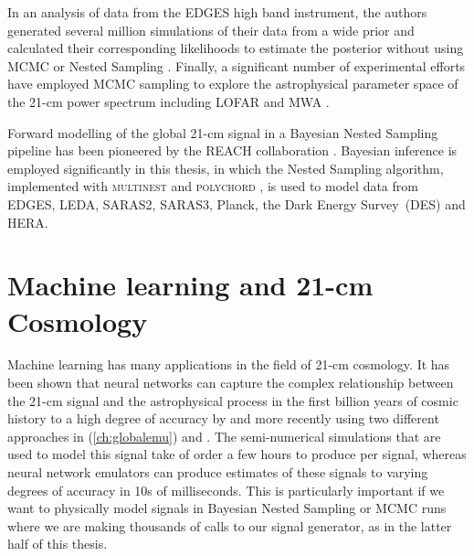 In an analysis of data from the EDGES high band instrument, the authors generated several million simulations of their data from a wide prior and calculated their corresponding likelihoods to estimate the posterior without using MCMC or Nested Sampling \cite{Monsalve_EDGES_HB_3_2019}. Finally, a significant number of experimental efforts have employed MCMC sampling to explore the astrophysical parameter space of the 21-cm power spectrum including LOFAR \cite{Ghara_LOFAR_2020} and MWA \cite{Ghara_MWA_2021}. 

Forward modelling of the global 21-cm signal in a Bayesian Nested Sampling pipeline has been pioneered by the REACH collaboration \cite{Anstey_REACH_2021, Anstey_antenna_2022}. Bayesian inference is employed significantly in this thesis, in which the Nested Sampling algorithm, implemented with \textsc{multinest} \cite{multinest_2008, multinest_2009, multinest_2019, PyMultiNest} and \textsc{polychord} \cite{Handley2015a, Handley2015b}, is used to model data from EDGES, LEDA, SARAS2, SARAS3, Planck, the Dark Energy Survey~(DES) and HERA.

\section{Machine learning and 21-cm Cosmology}
\label{sec:neural_networks}

Machine learning has many applications in the field of 21-cm cosmology. It has been shown that neural networks can capture the complex relationship between the 21-cm signal and the astrophysical process in the first billion years of cosmic history to a high degree of accuracy by \cite{Cohen2020} and more recently using two different approaches in \cite{Bevins_globalemu_2021} (\cref{ch:globalemu}) and \cite{21cmVAE}. The semi-numerical simulations that are used to model this signal take of order a few hours to produce per signal, whereas neural network emulators can produce estimates of these signals to varying degrees of accuracy in 10s of milliseconds. This is particularly important if we want to physically model signals in Bayesian Nested Sampling or MCMC runs where we are making thousands of calls to our signal generator, as in the latter half of this thesis.

